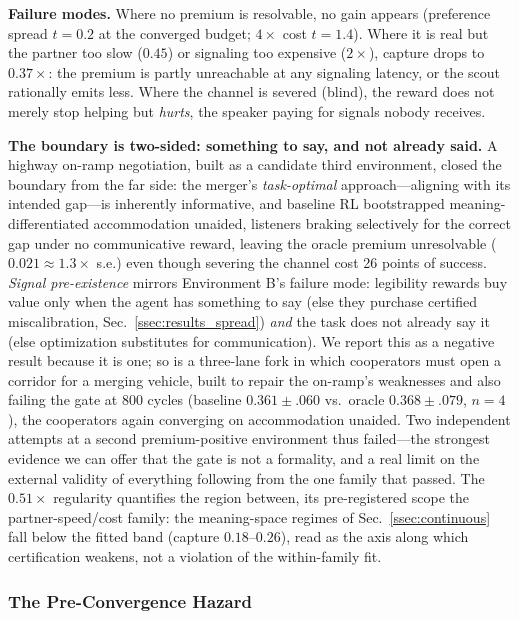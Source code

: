 \documentclass[sigconf,review,anonymous]{acmart}
\begin{document}
\textbf{Failure modes.} Where no premium is resolvable, no gain appears (preference spread $t{=}0.2$ at the converged budget; $4\times$ cost $t{=}1.4$). Where it is real but the partner too slow ($0.45$) or signaling too expensive ($2\times$), capture drops to $0.37\times$: the premium is partly unreachable at any signaling latency, or the scout rationally emits less. Where the channel is severed (blind), the reward does not merely stop helping but \emph{hurts}, the speaker paying for signals nobody receives.

\textbf{The boundary is two-sided: something to say, and not already said.} A highway on-ramp negotiation, built as a candidate third environment, closed the boundary from the far side: the merger's \emph{task-optimal} approach---aligning with its intended gap---is inherently informative, and baseline RL bootstrapped meaning-differentiated accommodation unaided, listeners braking selectively for the correct gap under no communicative reward, leaving the oracle premium unresolvable ($0.021\approx1.3\times$ s.e.) even though severing the channel cost 26 points of success. \emph{Signal pre-existence} mirrors Environment B's failure mode: legibility rewards buy value only when the agent has something to say (else they purchase certified miscalibration, Sec.~\ref{ssec:results_spread}) \emph{and} the task does not already say it (else optimization substitutes for communication). We report this as a negative result because it is one; so is a three-lane fork in which cooperators must open a corridor for a merging vehicle, built to repair the on-ramp's weaknesses and also failing the gate at $800$ cycles (baseline $0.361\pm.060$ vs.\ oracle $0.368\pm.079$, $n{=}4$), the cooperators again converging on accommodation unaided. Two independent attempts at a second premium-positive environment thus failed---the strongest evidence we can offer that the gate is not a formality, and a real limit on the external validity of everything following from the one family that passed. The $0.51\times$ regularity quantifies the region between, its pre-registered scope the partner-speed/cost family: the meaning-space regimes of Sec.~\ref{ssec:continuous} fall below the fitted band (capture $0.18$--$0.26$), read as the axis along which certification weakens, not a violation of the within-family fit.

\subsubsection{The Pre-Convergence Hazard}
\label{ssec:results_dynamics}
\end{document}
